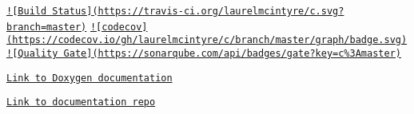 \href{https://travis-ci.org/laurelmcintyre/c}{\tt !\mbox{[}Build Status\mbox{]}(https\-://travis-\/ci.\-org/laurelmcintyre/c.\-svg?branch=master)} \href{https://codecov.io/gh/laurelmcintyre/c}{\tt !\mbox{[}codecov\mbox{]}(https\-://codecov.\-io/gh/laurelmcintyre/c/branch/master/graph/badge.\-svg)} \href{https://sonarqube.com/dashboard?id=c%3Amaster}{\tt !\mbox{[}Quality Gate\mbox{]}(https\-://sonarqube.\-com/api/badges/gate?key=c\%3\-Amaster)}

\href{https://laurelmcintyre.github.io/c/html/index.html}{\tt Link to Doxygen documentation}

\href{https://github.com/laurelmcintyre/documentation}{\tt Link to documentation repo} 